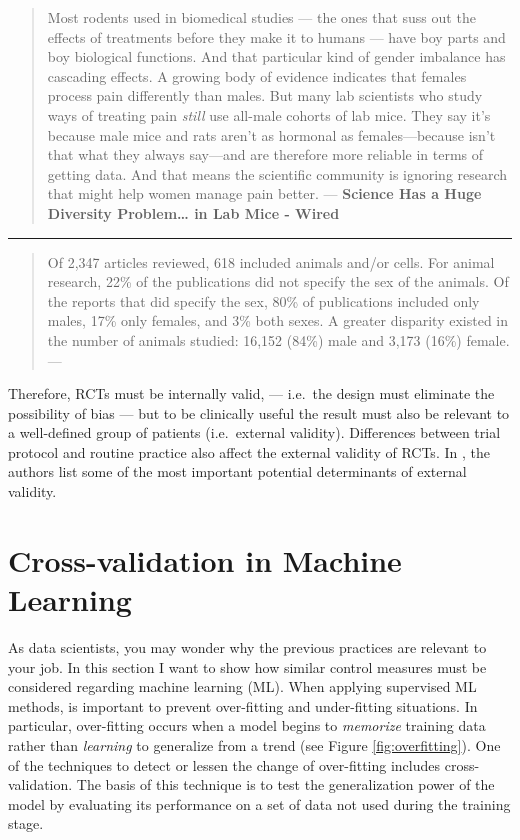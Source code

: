 \documentclass[
]{book}
\begin{document}
\begin{quote}
Most rodents used in biomedical studies --- the ones that suss out the effects of treatments before they make it to humans --- have boy parts and boy biological functions. And that particular kind of gender imbalance has cascading effects. A growing body of evidence indicates that females process pain differently than males. But many lab scientists who study ways of treating pain \emph{still }use all-male cohorts of lab mice. They say it's because male mice and rats aren't as hormonal as females---because isn't that what they always say---and are therefore more reliable in terms of getting data. And that means the scientific community is ignoring research that might help women manage pain better. --- \textbf{Science Has a Huge Diversity Problem\ldots{} in Lab Mice - Wired}
\end{quote}

\begin{center}\rule{0.5\linewidth}{0.5pt}\end{center}

\begin{quote}
Of 2,347 articles reviewed, 618 included animals and/or cells. For animal research, 22\% of the publications did not specify the sex of the animals. Of the reports that did specify the sex, 80\% of publications included only males, 17\% only females, and 3\% both sexes. A greater disparity existed in the number of animals studied: 16,152 (84\%) male and 3,173 (16\%) female. --- \citep{yoon2014sex}
\end{quote}

Therefore, RCTs must be internally valid, --- i.e.~the design must eliminate the possibility of bias --- but to be clinically useful the result must also be relevant to a well-defined group of patients (i.e.~external validity). Differences between trial protocol and routine practice also affect the external validity of RCTs. In \citep{rothwell2006factors}, the authors list some of the most important potential determinants of external validity.

\hypertarget{cross-validation-in-machine-learning}{%
\section{Cross-validation in Machine Learning}\label{cross-validation-in-machine-learning}}

As data scientists, you may wonder why the previous practices are relevant to your job. In this section I want to show how similar control measures must be considered regarding machine learning (ML). When applying supervised ML methods, is important to prevent over-fitting and under-fitting situations. In particular, over-fitting occurs when a model begins to \emph{memorize} training data rather than \emph{learning} to generalize from a trend (see Figure \ref{fig:overfitting}). One of the techniques to detect or lessen the change of over-fitting includes cross-validation. The basis of this technique is to test the generalization power of the model by evaluating its performance on a set of data not used during the training stage.
\end{document}
